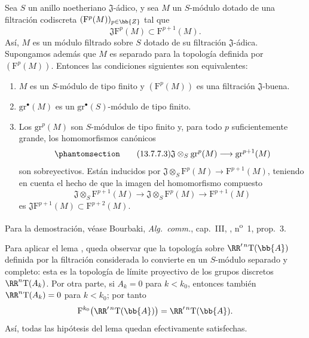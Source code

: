 \documentclass[oneside]{amsart}
\newcommand{\oldpage}[2][]{{\marginnote{\normalfont\textbf{#1}~|~#2}}\ignorespaces}
\let\EGAOriginalLabel\label
\renewcommand{\label}[1]{\phantomsection\EGAOriginalLabel{#1}}
\begin{document}
\begin{lemma}[13.7.7.2]
\label{0.13.7.7.2}
Sea $S$ un anillo noetheriano $\mathfrak{J}$-ádico, y sea $M$
un $S$-módulo dotado de una filtración codiscreta
$(\mathrm{F}^p(M))_{p\in\bb{Z}}$ tal que
\[
  \mathfrak{J}\mathrm{F}^p(M)
  \subset
  \mathrm{F}^{p+1}(M).
\]
Así, $M$ es un módulo filtrado sobre $S$ dotado de su
filtración $\mathfrak{J}$-ádica.
Supongamos además que $M$ es separado para la topología definida por
$(\mathrm{F}^p(M))$.
Entonces las condiciones siguientes son equivalentes:
\begin{enumerate}
  \item[{\rm a)}] $M$ es un $S$-módulo de tipo finito y
  $(\mathrm{F}^p(M))$ es una filtración $\mathfrak{J}$-buena.
  \item[{\rm b)}] $\mathrm{gr}^\bullet(M)$ es un
  $\mathrm{gr}^\bullet(S)$-módulo de tipo finito.
  \item[{\rm c)}] Los $\mathrm{gr}^p(M)$ son $S$-módulos de
  tipo finito y, para todo $p$ suficientemente grande, los homomorfismos
  canónicos
  \begin{equation}
  \label{0.13.7.7.3}
  \tag{13.7.7.3}
    \mathfrak{J}\otimes_S\mathrm{gr}^p(M)
    \longrightarrow
    \mathrm{gr}^{p+1}(M)
  \end{equation}
  \oldpage[0\textsubscript{III}]{79}
  son sobreyectivos.
  Están inducidos por
  $\mathfrak{J}\otimes_S\mathrm{F}^p(M)
  \longrightarrow\mathrm{F}^{p+1}(M)$, teniendo en cuenta el hecho
  de que la imagen del homomorfismo compuesto
  \[
    \mathfrak{J}\otimes_S\mathrm{F}^{p+1}(M)
    \longrightarrow
    \mathfrak{J}\otimes_S\mathrm{F}^p(M)
    \longrightarrow
    \mathrm{F}^{p+1}(M)
  \]
  es
  $\mathfrak{J}\mathrm{F}^{p+1}(M)
  \subset\mathrm{F}^{p+2}(M)$.
\end{enumerate}
\end{lemma}

Para la demostración, véase Bourbaki, \emph{Alg.\ comm.}, cap.~III,
, n\textsuperscript{o}~1, prop.~3.

\begin{env}[13.7.7.4]
\label{0.13.7.7.4}
Para aplicar el lema , queda observar que la
topología sobre $\RR'^{\,n}\mathrm{T}(\bb{A})$ definida por la filtración
considerada lo convierte en un $S$-módulo separado y completo:
esta es la topología de límite proyectivo de los grupos discretos
$\RR^n\mathrm{T}(A_k)$.
Por otra parte, si $A_k=0$ para $k<k_0$, entonces también
$\RR^n\mathrm{T}(A_k)=0$ para $k<k_0$; por tanto
\[
  \mathrm{F}^{k_0}\bigl(\RR'^{\,n}\mathrm{T}(\bb{A})\bigr)
  =
  \RR'^{\,n}\mathrm{T}(\bb{A}).
\]
Así, todas las hipótesis del lema quedan efectivamente satisfechas.
\end{env}
\end{document}
